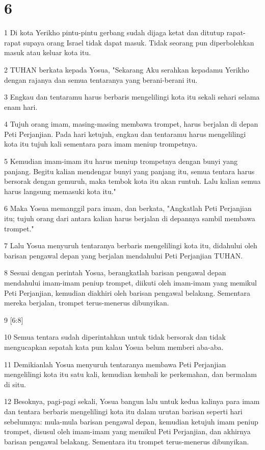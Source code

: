 \chapter{6}

\par 1 Di kota Yerikho pintu-pintu gerbang sudah dijaga ketat dan ditutup rapat-rapat supaya orang Israel tidak dapat masuk. Tidak seorang pun diperbolehkan masuk atau keluar kota itu.
\par 2 TUHAN berkata kepada Yosua, "Sekarang Aku serahkan kepadamu Yerikho dengan rajanya dan semua tentaranya yang berani-berani itu.
\par 3 Engkau dan tentaramu harus berbaris mengelilingi kota itu sekali sehari selama enam hari.
\par 4 Tujuh orang imam, masing-masing membawa trompet, harus berjalan di depan Peti Perjanjian. Pada hari ketujuh, engkau dan tentaramu harus mengelilingi kota itu tujuh kali sementara para imam meniup trompetnya.
\par 5 Kemudian imam-imam itu harus meniup trompetnya dengan bunyi yang panjang. Begitu kalian mendengar bunyi yang panjang itu, semua tentara harus bersorak dengan gemuruh, maka tembok kota itu akan runtuh. Lalu kalian semua harus langsung memasuki kota itu."
\par 6 Maka Yosua memanggil para imam, dan berkata, "Angkatlah Peti Perjanjian itu; tujuh orang dari antara kalian harus berjalan di depannya sambil membawa trompet."
\par 7 Lalu Yosua menyuruh tentaranya berbaris mengelilingi kota itu, didahului oleh barisan pengawal depan yang berjalan mendahului Peti Perjanjian TUHAN.
\par 8 Sesuai dengan perintah Yosua, berangkatlah barisan pengawal depan mendahului imam-imam peniup trompet, diikuti oleh imam-imam yang memikul Peti Perjanjian, kemudian diakhiri oleh barisan pengawal belakang. Sementara mereka berjalan, trompet terus-menerus dibunyikan.
\par 9 [6:8]
\par 10 Semua tentara sudah diperintahkan untuk tidak bersorak dan tidak mengucapkan sepatah kata pun kalau Yosua belum memberi aba-aba.
\par 11 Demikianlah Yosua menyuruh tentaranya membawa Peti Perjanjian mengelilingi kota itu satu kali, kemudian kembali ke perkemahan, dan bermalam di situ.
\par 12 Besoknya, pagi-pagi sekali, Yosua bangun lalu untuk kedua kalinya para imam dan tentara berbaris mengelilingi kota itu dalam urutan barisan seperti hari sebelumnya: mula-mula barisan pengawal depan, kemudian ketujuh imam peniup trompet, disusul oleh imam-imam yang memikul Peti Perjanjian, dan akhirnya barisan pengawal belakang. Sementara itu trompet terus-menerus dibunyikan.
